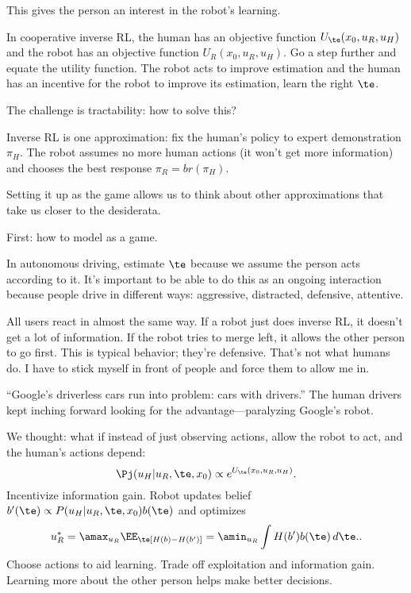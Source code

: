 This gives the person an interest in the robot's learning. 

In cooperative inverse RL, the human has an objective function $U_\te(x_0,u_R,u_H)$ and the robot has an objective function $U_R(x_0,u_R,u_H)$. Go a step further and equate the utility function. The robot acts to improve estimation and the human has an incentive for the robot to improve its estimation, learn the right $\te$.

The challenge is tractability: how to solve this?

Inverse RL is one approximation: fix the human's policy to expert demonstration $\pi_H$. The robot assumes no more human actions (it won't get more information)  and chooses the best response $\pi_R=br(\pi_H)$.

Setting it up as the game allows us to think about other approximations that take us closer to the desiderata.


First: how to model as a game.

In autonomous driving, estimate $\te$ because we assume the person acts according to it. It's important to be able to do this as an ongoing interaction because people drive in different ways: aggressive, distracted, defensive, attentive.

All users react in almost the same way. If a robot just does inverse RL, it doesn't get a lot of information. If the robot tries to merge left, it allows the other person to go first. This is typical behavior; they're defensive.
That's not what humans do. I have to stick myself in front of people and force them to allow me in.

``Google's driverless cars run into problem: cars with drivers.'' The human drivers kept inching forward looking for the advantage---paralyzing Google's robot.

We thought: what if %
instead of just observing actions, allow the robot to act, and the human's actions depend:
$$
\Pj(u_H|u_R, \te,x_0) \propto e^{U_\te(x_0,u_R,u_H)}.
$$
Incentivize information gain. Robot updates belief $b'(\te)\propto P(u_H|u_R, \te, x_0)b(\te)$ and optimizes
$$u_R^* = \amax_{u_R} \EE_\te [H(b)-H(b')]
=\amin_{u_R} \int H(b')b(\te)\,d\te.
.$$
Choose actions to aid learning.
Trade off exploitation and information gain.
Learning more about the other person helps make better decisions.

